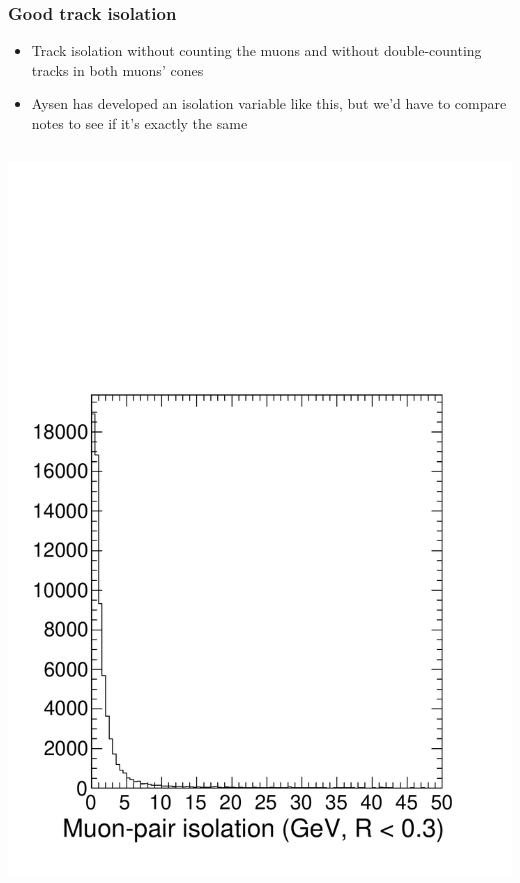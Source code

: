 \documentclass[compress]{beamer}
\begin{document}
\begin{frame}
\frametitle{Good track isolation}

\begin{itemize}
\item Track isolation without counting the muons and without
  double-counting tracks in both muons' cones
\item Aysen has developed an isolation variable like this, but we'd
  have to compare notes to see if it's exactly the same
\end{itemize}

\begin{columns}
\includegraphics[width=\linewidth]{bubbleiso.pdf}

\end{columns}
\end{frame}
\end{document}
